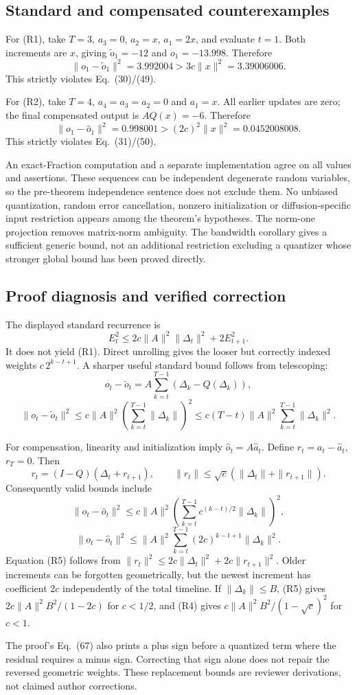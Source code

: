 \documentclass[10pt]{article}
\begin{document}
\subsection*{Standard and compensated counterexamples}
For (R1), take \(T=3\), \(a_3=0\), \(a_2=x\), \(a_1=2x\), and evaluate \(t=1\). Both increments are \(x\), giving \(\widetilde o_1=-12\) and \(o_1=-13.998\). Therefore \[\|o_1-\widetilde o_1\|^2=3.992004
 >3c\|x\|^2=3.39006006.\] This strictly violates Eq. (30)/(49).\par
For (R2), take \(T=4\), \(a_4=a_3=a_2=0\) and \(a_1=x\). All earlier updates are zero; the final compensated output is \(AQ(x)=-6\). Therefore \[\|o_1-\widehat o_1\|^2=0.998001
 >(2c)^2\|x\|^2=0.0452008008.\] This strictly violates Eq. (31)/(50).\par
An exact-Fraction computation and a separate implementation agree on all values and assertions. These sequences can be independent degenerate random variables, so the pre-theorem independence sentence does not exclude them. No unbiased quantization, random error cancellation, nonzero initialization or diffusion-specific input restriction appears among the theorem’s hypotheses. The norm-one projection removes matrix-norm ambiguity. The bandwidth corollary gives a sufficient generic bound, not an additional restriction excluding a quantizer whose stronger global bound has been proved directly.\par
\subsection*{Proof diagnosis and verified correction}
The displayed standard recurrence is \[E_t^2\le2c\|A\|^2\|\Delta_t\|^2+2E_{t+1}^2.\] It does not yield (R1). Direct unrolling gives the looser but correctly indexed weights \(c\,2^{k-t+1}\). A sharper useful standard bound follows from telescoping: \[o_t-\widetilde o_t=A\sum_{k=t}^{T-1}(\Delta_k-Q(\Delta_k)),\] \[\|o_t-\widetilde o_t\|^2
 \le c\|A\|^2\left(\sum_{k=t}^{T-1}\|\Delta_k\|\right)^2
 \le c(T-t)\|A\|^2\sum_{k=t}^{T-1}\|\Delta_k\|^2. \tag{R3}\]\par
For compensation, linearity and initialization imply \(\widehat o_t=A\widehat a_t\). Define \(r_t=a_t-\widehat a_t\), \(r_T=0\). Then \[r_t=(I-Q)(\Delta_t+r_{t+1}),\qquad
 \|r_t\|\le\sqrt c(\|\Delta_t\|+\|r_{t+1}\|).\] Consequently valid bounds include \[\|o_t-\widehat o_t\|^2
 \le c\|A\|^2
 \left(\sum_{k=t}^{T-1}c^{(k-t)/2}\|\Delta_k\|\right)^2, \tag{R4}\] \[\|o_t-\widehat o_t\|^2
 \le\|A\|^2\sum_{k=t}^{T-1}(2c)^{k-t+1}\|\Delta_k\|^2. \tag{R5}\] Equation (R5) follows from \(\|r_t\|^2\le2c\|\Delta_t\|^2+2c\|r_{t+1}\|^2\). Older increments can be forgotten geometrically, but the newest increment has coefficient \(2c\) independently of the total timeline. If \(\|\Delta_k\|\le B\), (R5) gives \(2c\|A\|^2B^2/(1-2c)\) for \(c<1/2\), and (R4) gives \(c\|A\|^2B^2/(1-\sqrt c)^2\) for \(c<1\).\par
The proof’s Eq. (67) also prints a plus sign before a quantized term where the residual requires a minus sign. Correcting that sign alone does not repair the reversed geometric weights. These replacement bounds are reviewer derivations, not claimed author corrections.\par
\end{document}
